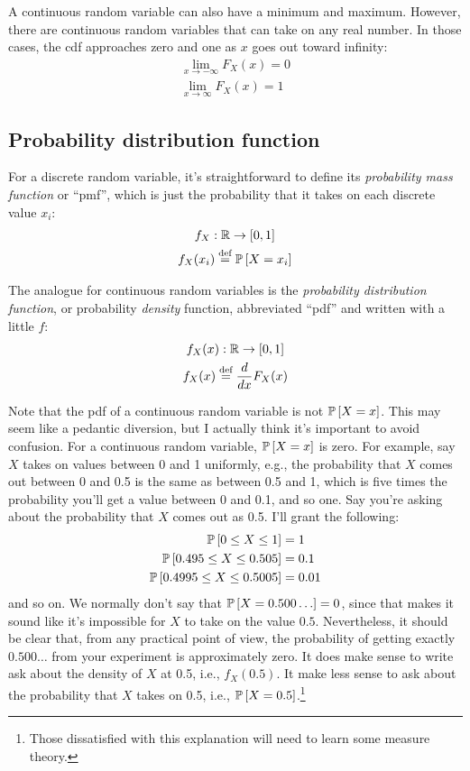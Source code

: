 
A continuous random variable can also have a minimum and maximum. However,
there are continuous random variables that can take on any real number. In
those cases, the cdf approaches zero and one as $x$ goes out toward infinity:
\begin{gather}
\lim_{x \to -\infty} F_X(x) = 0 \\
\lim_{x \to \infty} F_X(x) = 1
\end{gather}


\subsection{Probability distribution function}

For a discrete random variable, it's straightforward to define its
\emph{probability mass function} or ``pmf'', which is just the probability
that it takes on each discrete value $x_i$:
\begin{gather*}
f_X : \mathbb{R} \to [0, 1] \\
f_X(x_i) \stackrel{\text{def}}{=} \mathbb{P}\left[{X = x_i}\right]
\end{gather*}

The analogue for continuous random variables is the \emph{probability
distribution function}, or probability \emph{density} function,
abbreviated ``pdf'' and written with a little $f$:
\begin{gather*}
f_X(x) : \mathbb{R} \to [0, 1] \\
f_X(x) \stackrel{\text{def}}{=} \frac{d}{dx} F_X(x)
\end{gather*}

Note that the pdf of a continuous random variable is not $\mathbb{P}\left[{X = x}\right]$. This
may seem like a pedantic diversion, but I actually think it's important to
avoid confusion. For a continuous random variable, $\mathbb{P}\left[{X = x}\right]$ is zero. For
example, say $X$ takes on values between 0 and 1 uniformly, e.g., the
probability that $X$ comes out between 0 and 0.5 is the same as between 0.5
and 1, which is five times the probability you'll get a value between 0 and
0.1, and so one. Say you're asking about the probability that $X$ comes out as
0.5. I'll grant the following:
\begin{align*}
\mathbb{P}\left[{0 \leq X \leq 1}\right] &= 1 \\
\mathbb{P}\left[{0.495 \leq X \leq 0.505}\right] &= 0.1 \\
\mathbb{P}\left[{0.4995 \leq X \leq 0.5005}\right] &= 0.01
\end{align*}
and so on. We normally don't say that $\mathbb{P}\left[{X = 0.500\ldots}\right] = 0$, since that
makes it sound like it's impossible for $X$ to take on the value $0.5$.
Nevertheless, it should be clear that, from any practical point of view, the
probability of getting exactly $0.500\ldots$ from your experiment is
approximately zero. It does make sense to write ask about the density of $X$
at 0.5, i.e., $f_X(0.5)$. It make less sense to ask about the probability that
$X$ takes on 0.5, i.e., $\mathbb{P}\left[{X = 0.5}\right]$.\footnote{Those dissatisfied with
this explanation will need to learn some measure theory.}

